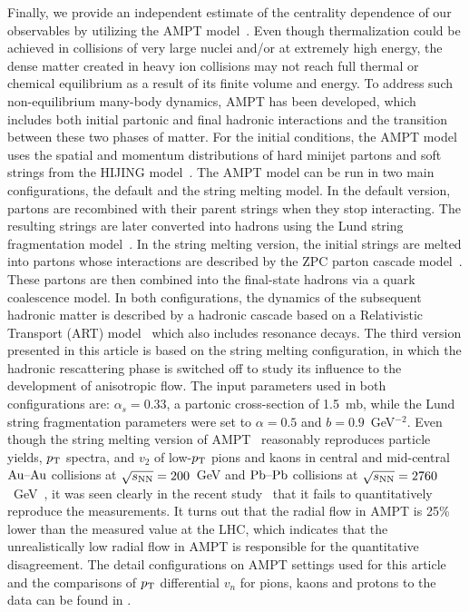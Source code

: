 \documentclass[ALICE,manyauthors]{cernphprep}
\begin{document}
Finally, we provide an independent estimate of the centrality dependence of our observables by utilizing the {AMPT} model~\cite{Zhang:1999bd,Lin:2000cx,Lin:2004en}.
Even though thermalization could be achieved in collisions of very large nuclei and/or at extremely high energy, the dense matter created in heavy ion collisions may not reach full thermal or chemical equilibrium as a result of its finite volume and energy. To address such non-equilibrium many-body dynamics, AMPT has been developed, which includes both initial partonic and final hadronic interactions and the transition between these two phases of matter.
For the initial conditions, the AMPT model uses the spatial and momentum distributions of hard minijet partons and soft strings from the HIJING model~\cite{Wang:1991hta,Gyulassy:1994ew}.
The AMPT model can be run in two main configurations, the default and the string melting model.
In the default version, partons are recombined with their parent strings when they stop interacting. The resulting strings are later converted into hadrons using the Lund string fragmentation model~\cite{Andersson:1986gw,NilssonAlmqvist:1986rx}. In the string melting version, the initial strings are melted into partons whose interactions are described by the ZPC parton cascade model~\cite{Zhang:1997ej}. These partons are then combined into the final-state hadrons via a quark coalescence model. 
In both configurations, the dynamics of the subsequent hadronic matter is described by a hadronic cascade based on a Relativistic Transport (ART) model~\cite{Li:2001xh} which also includes resonance decays.
The third version presented in this article is based on the string melting configuration, in which the hadronic rescattering phase is switched off to study its influence to the development of anisotropic flow.
The input parameters used in both configurations are: $\alpha_s = 0.33$, a partonic cross-section of 1.5~mb, while the Lund string fragmentation parameters were set to $\alpha = 0.5$ and $b = 0.9$~GeV$^{-2}$. 
Even though the string melting version of AMPT~\cite{Lin:2001zk,Lin:2004en} reasonably reproduces particle yields, $p_{\textnormal{T}}$ spectra, and $v_2$ of low-$p_{\textnormal{T}}$ pions and kaons in central and mid-central $\textnormal{Au--Au}$ collisions at $\sqrt{s_{\textnormal{NN}}}=200$~GeV and $\textnormal{Pb--Pb}$ collisions at $\sqrt{s_{\textnormal{NN}}}=2760$~GeV~\cite{Lin:2014tya}, it was seen clearly in the recent study~\cite{Adam:2016nfo} that it fails to quantitatively reproduce the measurements. It turns out that the radial flow in AMPT is 25\% lower than the measured value at the LHC, which indicates that the unrealistically low radial flow in AMPT is responsible for the quantitative disagreement. The detail configurations on AMPT settings used for this article and the comparisons of $p_{\textnormal{T}}{}$ differential $v_{n}$ for pions, kaons and protons to the data can be found in \cite{Adam:2016nfo}.
\end{document}
